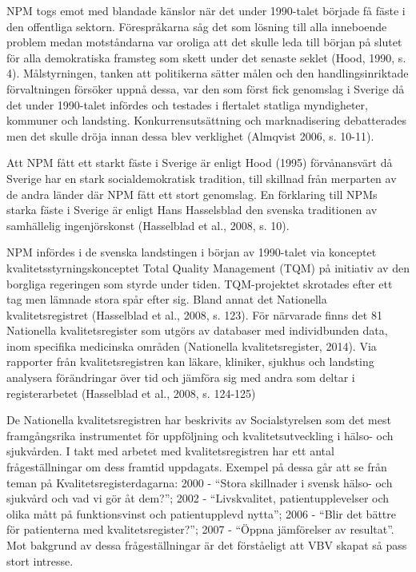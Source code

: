NPM togs emot med blandade känslor när det under 1990-talet började få fäste i den offentliga sektorn. Förespråkarna såg det som lösning till alla inneboende problem medan motståndarna var oroliga att det skulle leda till början på slutet för alla demokratiska framsteg som skett under det senaste seklet (Hood, 1990, s. 4). Målstyrningen, tanken att politikerna sätter målen och den handlingsinriktade förvaltningen försöker uppnå dessa, var den som först fick genomslag i Sverige då det under 1990-talet infördes och testades i flertalet statliga myndigheter, kommuner och landsting. Konkurrensutsättning och marknadisering debatterades men det skulle dröja innan dessa blev verklighet (Almqvist 2006, s. 10-11).
 
Att NPM fått ett starkt fäste i Sverige är enligt Hood (1995) förvånansvärt då Sverige har en stark socialdemokratisk tradition, till skillnad från merparten av de andra länder där NPM fått ett stort genomslag. En förklaring till NPMs starka fäste i Sverige är enligt Hans Hasselsblad den svenska traditionen av samhällelig ingenjörskonst (Hasselblad et al., 2008, s. 10).
 
NPM infördes i de svenska landstingen i början av 1990-talet via konceptet kvalitetsstyrningskonceptet Total Quality Management (TQM) på initiativ av den borgliga regeringen som styrde under tiden. TQM-projektet skrotades efter ett tag men lämnade stora spår efter sig. Bland annat det Nationella kvalitetsregistret (Hasselblad et al., 2008, s. 123). För närvarade finns det 81 Nationella kvalitetsregister som utgörs av databaser med individbunden data, inom specifika medicinska områden (Nationella kvalitetsregister, 2014). Via rapporter från kvalitetsregistren kan läkare, kliniker, sjukhus och landsting analysera förändringar över tid och jämföra sig med andra som deltar i registerarbetet (Hasselblad et al., 2008, s. 124-125)

De Nationella kvalitetsregistren har beskrivits av Socialstyrelsen som det mest framgångsrika instrumentet för uppföljning och kvalitetsutveckling i hälso- och sjukvården. I takt med arbetet med kvalitetsregistren har ett antal frågeställningar om dess framtid uppdagats. Exempel på dessa går att se från teman på Kvalitetsregisterdagarna: 2000 - “Stora skillnader i svensk hälso- och sjukvård och vad vi gör åt dem?”; 2002 - “Livskvalitet, patientupplevelser och olika mått på funktionsvinst och patientupplevd nytta”; 2006 - “Blir det bättre för patienterna med kvalitetsregister?”; 2007 - “Öppna jämförelser av resultat”. Mot bakgrund av dessa frågeställningar är det förståeligt att VBV skapat så pass stort intresse. 

